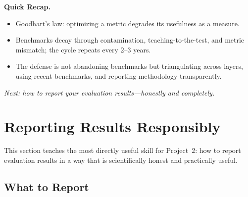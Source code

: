\noindent{}

\begin{quickrecap}
\textbf{Quick Recap.}
\begin{itemize}[nosep,leftmargin=1.5em]
  \item Goodhart's law: optimizing a metric degrades its usefulness as a measure.
  \item Benchmarks decay through contamination, teaching-to-the-test, and metric mismatch; the cycle repeats every 2--3 years.
  \item The defense is not abandoning benchmarks but triangulating across layers, using recent benchmarks, and reporting methodology transparently.
\end{itemize}
\textit{Next: how to report your evaluation results---honestly and completely.}
\end{quickrecap}


\section{Reporting Results Responsibly}
\label{sec:reporting}

This section teaches the most directly useful skill for Project~2: how to report evaluation results in a way that is scientifically honest and practically useful.

\subsection{What to Report}

